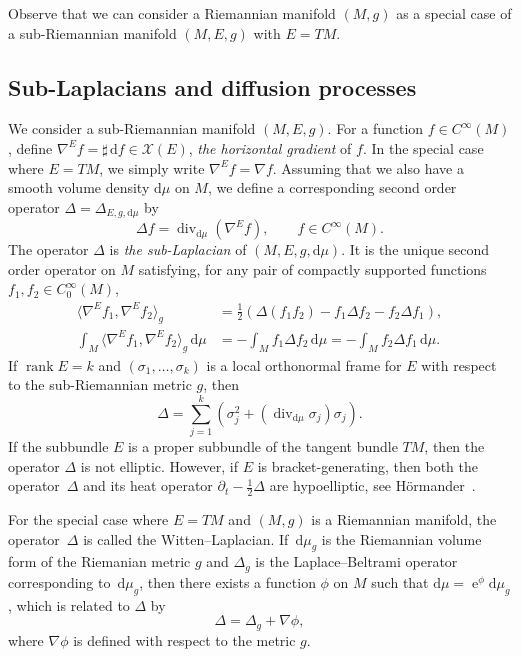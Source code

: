 \documentclass[10pt]{amsart}
\theoremstyle{remark}
\newcommand{\calX}{\mathcal{X}}
\DeclareMathOperator{\rank}{rank}
\DeclareMathOperator{\dv}{div}
\newcommand{\dd}{\,{\mathrm d}}
\newcommand{\db}{{\mathrm d}}
\newcommand{\e}{\operatorname{e}}
\numberwithin{equation}{section}
\begin{document}
Observe that we can consider a Riemannian manifold $(M,g)$ as a special case of a sub-Riemannian manifold $(M,E,g)$ with $E = TM$.


\subsection{Sub-Laplacians and diffusion processes}
We consider a sub-Riemannian manifold $(M, E, g)$.
For a function $f \in C^\infty(M)$, define $\nabla^E f = \sharp \dd f \in \calX(E)$, \emph{the horizontal gradient} of $f$. In the special case where $E =TM$, we simply write $\nabla^E f= \nabla f$. Assuming that we also have a smooth volume density $\db\mu$ on $M$, we define a corresponding second order operator $\Delta = \Delta_{E,g,\db\mu}$ by
$$\Delta f = \dv_{\db\mu}(\nabla^E f), \qquad f\in C^\infty(M).$$
The operator $\Delta$ is \emph{the sub-Laplacian} of $(M,E,g,\db\mu)$. It is the unique second order operator on $M$ satisfying, for any pair of compactly supported functions $f_1, f_2 \in C^\infty_0(M)$,
\begin{align*}
    \langle \nabla^E f_1, \nabla^E f_2 \rangle_g & = \frac{1}{2} \left( \Delta (f_1 f_2) - f_1 \Delta f_2 - f_2 \Delta f_1\right),\\
    \int_M \langle \nabla^E f_1, \nabla^E f_2 \rangle_g \dd\mu & = - \int_M f_1 \Delta f_2 \dd\mu = - \int_M f_2 \Delta f_1 \dd\mu.
\end{align*}
If $\rank E=k$ and $(\sigma_1, \dots, \sigma_k)$ is a local orthonormal frame for $E$ with respect to the sub-Riemannian metric $g$, then
$$\Delta = \sum_{j=1}^k (\sigma_j^2 + (\dv_{\db\mu} \sigma_j) \sigma_j).$$
If the subbundle $E$ is a proper subbundle of the tangent bundle $TM$, then the operator $\Delta$ is not elliptic. However, if $E$ is bracket-generating, then both the operator~$\Delta$ and its heat operator $\partial_t - \frac{1}{2} \Delta$ are hypoelliptic, see H\"ormander~\cite{Hor67}.

For the special case where $E  = TM$ and $(M,g)$ is a Riemannian manifold, the operator~$\Delta$ is called the Witten--Laplacian. If $\dd\mu_g$ is the Riemannian volume form of the Riemanian metric $g$ and $\Delta_g$ is the Laplace--Beltrami operator corresponding to $\dd\mu_g$, then there exists a function $\phi$ on $M$ such that $\db\mu = \e^\phi \db\mu_g$, which is related to $\Delta$ by
$$\Delta = \Delta_g + \nabla \phi,$$
where $\nabla \phi$ is defined with respect to the metric $g$.
\end{document}
